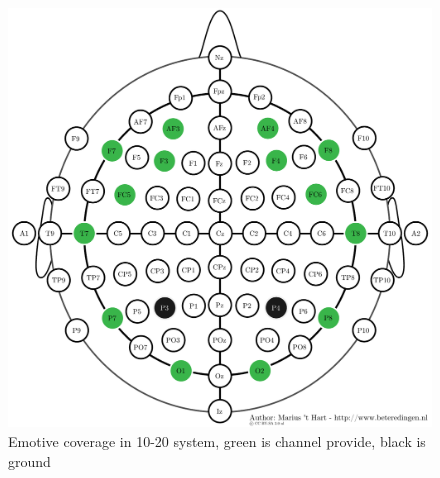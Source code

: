 \begin{figure}[ht]
	\centering
	\includegraphics[scale = 0.5]{chapter3/emotiv_electrodes_cover.pdf}
	\caption{Emotive coverage in 10-20 system, green is channel provide, black is ground}
\end{figure}

